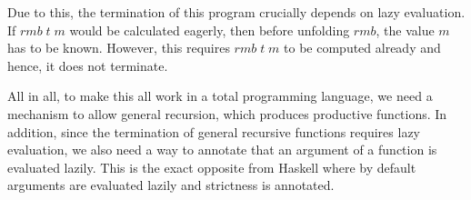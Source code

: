 \documentclass{amsart}
\newcommand{\Varid}[1]{\mathit{#1}}
\begin{document}
Due to this, the termination of this program crucially depends on lazy evaluation.
If \ensuremath{\Varid{rmb}\;\Varid{t}\;\Varid{m}} would be calculated eagerly, then before unfolding \ensuremath{\Varid{rmb}}, the value \ensuremath{\Varid{m}} has to be known.
However, this requires \ensuremath{\Varid{rmb}\;\Varid{t}\;\Varid{m}} to be computed already and hence, it does not terminate.

All in all, to make this all work in a total programming language, we need a mechanism to allow general recursion, which produces productive functions.
In addition, since the termination of general recursive functions requires lazy evaluation, we also need a way to annotate that an argument of a function is evaluated lazily.
This is the exact opposite from Haskell where by default arguments are evaluated lazily and strictness is annotated.





\end{document}
